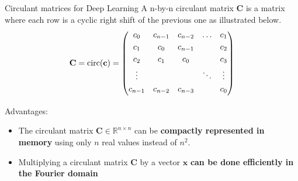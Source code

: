 \documentclass[9pt]{beamer}
\begin{document}
\begin{frame}{Circulant matrices for Deep Learning}
A n-by-n circulant matrix $\mathbf{C}$ is a matrix  where each row is a cyclic right shift of the previous one as illustrated below.
\begin{equation*}
    \mathbf{C} = \text{circ}(\mathbf{c}) = \begin{pmatrix} \vspace{0.1cm}
    c_0 & c_{n-1} & c_{n-2} & \dots & c_1 \\ \vspace{0.1cm}
    c_1 & c_0 & c_{n-1}  & & c_2 \\ \vspace{0.1cm}
    c_2 & c_{1} & c_{0} & & c_3 \\ \vspace{0.1cm}
    \vdots & & & \ddots  & \vdots \\ \vspace{0.1cm}
    c_{n-1} & c_{n-2} & c_{n-3} & & c_0
    \end{pmatrix}
\end{equation*}
\begin{block}{Advantages:}
  \begin{itemize}
  \item The circulant matrix $\mathbf{C} \in \mathbb{R}^{n\times n}$ can be \textbf{compactly represented in memory} using only $n$ real values instead of $n^2$.
  \item Multiplying a circulant matrix $\mathbf{C}$ by a vector $\mathbf{x}$ \textbf{can be done efficiently in the Fourier domain}
  \end{itemize}
\end{block}



\end{frame}
\end{document}
